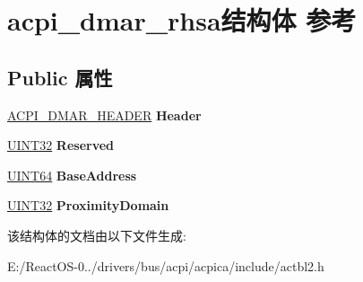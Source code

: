 \hypertarget{structacpi__dmar__rhsa}{}\section{acpi\+\_\+dmar\+\_\+rhsa结构体 参考}
\label{structacpi__dmar__rhsa}
\subsection*{Public 属性}
\begin{DoxyCompactItemize}
\item 
\mbox{\label{structacpi__dmar__rhsa_aaa5ff54684ca37e301522a4e55904391}} 
\hyperlink{structacpi__dmar__header}{A\+C\+P\+I\+\_\+\+D\+M\+A\+R\+\_\+\+H\+E\+A\+D\+ER} {\bfseries Header}
\item 
\mbox{\label{structacpi__dmar__rhsa_a790a49f4663f34a9152442403ca1b863}} 
\hyperlink{_processor_bind_8h_ae1e6edbbc26d6fbc71a90190d0266018}{U\+I\+N\+T32} {\bfseries Reserved}
\item 
\mbox{\label{structacpi__dmar__rhsa_afafdc5bed0e8da98c022f2754dbe7b9b}} 
\hyperlink{_processor_bind_8h_a57be03562867144161c1bfee95ca8f7c}{U\+I\+N\+T64} {\bfseries Base\+Address}
\item 
\mbox{\label{structacpi__dmar__rhsa_a0746c1f59225b2034df7d0388e4b8815}} 
\hyperlink{_processor_bind_8h_ae1e6edbbc26d6fbc71a90190d0266018}{U\+I\+N\+T32} {\bfseries Proximity\+Domain}
\end{DoxyCompactItemize}


该结构体的文档由以下文件生成\+:\begin{DoxyCompactItemize}
\item 
E\+:/\+React\+O\+S-\/0../drivers/bus/acpi/acpica/include/actbl2.\+h\end{DoxyCompactItemize}
